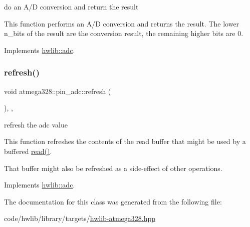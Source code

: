 do an A/D conversion and return the result

This function performs an A/D conversion and returns the result. The lower n\+\_\+bits of the result are the conversion result, the remaining higher bits are 0. 

Implements \hyperlink{classhwlib_1_1adc_ac39b506d3ae4eec08caa5aa7e69ab2fb}{hwlib\+::adc}.

\mbox{\label{classatmega328_1_1pin__adc_af71ffd74aacbf0aac5f6693a065896a2}} 
\subsubsection{\texorpdfstring{refresh()}{refresh()}}
{\footnotesize\ttfamily void atmega328\+::pin\+\_\+adc\+::refresh (\begin{DoxyParamCaption}{ }\end{DoxyParamCaption})\hspace{0.3cm}{\ttfamily [inline]}, {\ttfamily [override]}, {\ttfamily [virtual]}}

refresh the adc value

This function refreshes the contents of the read buffer that might be used by a buffered \hyperlink{classatmega328_1_1pin__adc_a4017fd7e32de94fc9e895cd9e9346430}{read()}.

That buffer might also be refreshed as a side-\/effect of other operations. 

Implements \hyperlink{classhwlib_1_1adc_a5484571b18d647ec78ba97e94c7ed836}{hwlib\+::adc}.



The documentation for this class was generated from the following file\+:\begin{DoxyCompactItemize}
\item 
code/hwlib/library/targets/\hyperlink{hwlib-atmega328_8hpp}{hwlib-\/atmega328.\+hpp}\end{DoxyCompactItemize}
